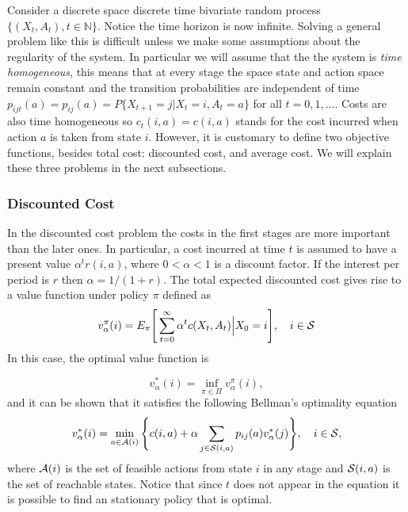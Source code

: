 \documentclass[11pt]{article}
\newcommand {\cA}{\ensuremath \mathcal{A}}
\newcommand {\cS}{\ensuremath \mathcal{S}}
\begin{document}
Consider a discrete space discrete time bivariate random process $\{(X_t,A_t), t \in \mathbb{N} \}$. Notice the time horizon is now infinite. Solving a general problem like this is difficult unless we make some assumptions about the regularity of the system. In particular we will assume that the the system is  \emph{time homogeneous}, this means that at every stage the space state and action space remain constant and  the transition probabilities are independent of time $p_{ijt}(a)= p_{ij}(a) = P\{X_{t+1}=j| X_t=i,A_t=a\}$ for all $t=0,1,\ldots$. Costs are also time homogeneous so $c_t(i,a)=c(i,a)$ stands for the cost incurred when action $a$ is taken from state $i$. However, it is customary to define two objective functions, besides total cost: discounted cost, and average cost. We will explain these three problems in the next subsections.

\subsubsection{Discounted Cost}

In the discounted cost problem the costs in the first stages are more important than the later ones. In particular, a cost incurred at time $t$ is assumed to have a present value $\alpha^tr(i,a)$, where $0<\alpha<1$ is a discount factor. If the interest per period is $r$ then $\alpha=1/(1+r)$. The total expected discounted cost gives rise to a value function under policy $\pi$ defined as
\begin{equation}
v_{\alpha}^{\pi}(i)=E_{\pi}\Bigg[\sum_{t=0}^\infty \alpha^t c(X_t,A_t)\Big|X_0=i\Bigg],\quad i\in \cS
\label{eq:discounted}\end{equation}
 In this case, the optimal value function is

\[v_{\alpha}^*(i)=\inf_{\pi \in \Pi} v_{\alpha}^{\pi}(i),\]
and it can be shown that it satisfies the following Bellman's optimality equation 
\begin{equation}\label{eq:bellmanDiscounted}
  v_{\alpha}^*(i) = \min_{a \in \mathcal{A}(i)} \Bigg \{ c(i,a) + \alpha\sum_{j \in \mathcal{S}(i,a)} p_{ij}(a)v_{\alpha}^*(j) \Bigg \} ,\quad i \in \cS,
\end{equation}
where $\cA(i)$ is the set of feasible actions from state $i$ in any stage and $\cS(i,a)$ is the set of reachable states. Notice that since $t$ does not appear in the equation it is possible to find an stationary policy that is optimal.
\end{document}
